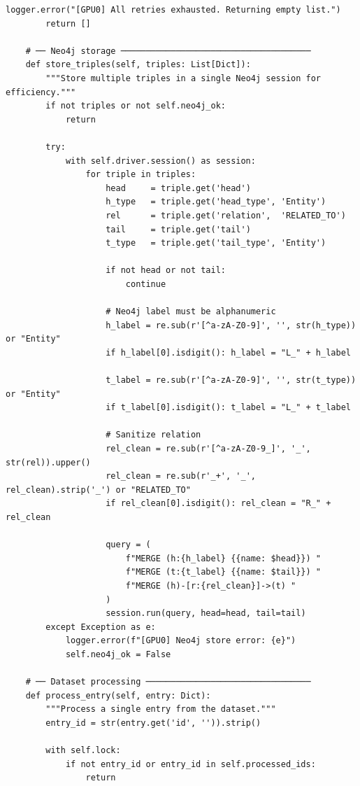\documentclass[11pt]{article}
\begin{document}
\begin{lstlisting}[style=pythoncode, caption={kg\_generator\_gpu\_0.py}]
        logger.error("[GPU0] All retries exhausted. Returning empty list.")
        return []

    # ── Neo4j storage ──────────────────────────────────────
    def store_triples(self, triples: List[Dict]):
        """Store multiple triples in a single Neo4j session for efficiency."""
        if not triples or not self.neo4j_ok:
            return
            
        try:
            with self.driver.session() as session:
                for triple in triples:
                    head     = triple.get('head')
                    h_type   = triple.get('head_type', 'Entity')
                    rel      = triple.get('relation',  'RELATED_TO')
                    tail     = triple.get('tail')
                    t_type   = triple.get('tail_type', 'Entity')

                    if not head or not tail:
                        continue

                    # Neo4j label must be alphanumeric
                    h_label = re.sub(r'[^a-zA-Z0-9]', '', str(h_type)) or "Entity"
                    if h_label[0].isdigit(): h_label = "L_" + h_label

                    t_label = re.sub(r'[^a-zA-Z0-9]', '', str(t_type)) or "Entity"
                    if t_label[0].isdigit(): t_label = "L_" + t_label

                    # Sanitize relation
                    rel_clean = re.sub(r'[^a-zA-Z0-9_]', '_', str(rel)).upper()
                    rel_clean = re.sub(r'_+', '_', rel_clean).strip('_') or "RELATED_TO"
                    if rel_clean[0].isdigit(): rel_clean = "R_" + rel_clean

                    query = (
                        f"MERGE (h:{h_label} {{name: $head}}) "
                        f"MERGE (t:{t_label} {{name: $tail}}) "
                        f"MERGE (h)-[r:{rel_clean}]->(t) "
                    )
                    session.run(query, head=head, tail=tail)
        except Exception as e:
            logger.error(f"[GPU0] Neo4j store error: {e}")
            self.neo4j_ok = False

    # ── Dataset processing ─────────────────────────────────
    def process_entry(self, entry: Dict):
        """Process a single entry from the dataset."""
        entry_id = str(entry.get('id', '')).strip()
        
        with self.lock:
            if not entry_id or entry_id in self.processed_ids:
                return


\end{lstlisting}
\end{document}
